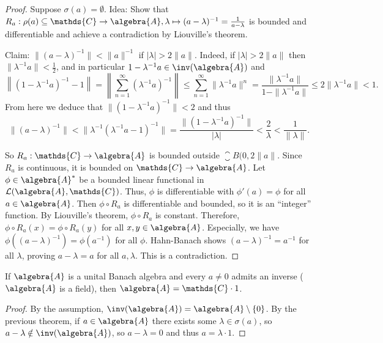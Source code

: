 \documentclass[a4paper]{article}
\begin{document}
\begin{proof}
	Suppose $\sigma(a) = \emptyset$.
	Idea: Show that $R_a: \rho(a) \subseteq \mathds{C} \to \algebra{A}, \lambda \mapsto (a - \lambda)^{-1} = \frac{1}{a - \lambda}$ is bounded and differentiable and achieve a contradiction by Liouville's theorem.

	Claim: $\| (a - \lambda)^{-1}\| < \|a\|^{-1}$ if $|\lambda| > 2 \|a\|$.
	Indeed, if $|\lambda| > 2 \|a\|$ then $\| \lambda^{-1} a \| < \frac{1}{2}$, and in particular $1 - \lambda^{-1} a \in \inv(\algebra{A})$ and
	\begin{equation*}
		\left\| (1 - \lambda^{-1} a)^{-1} - 1 \right\| = \left\| \sum_{n = 1}^{\infty} (\lambda^{-1} a)^{-1} \right\| \leq \sum_{n = 1}^{\infty} \|\lambda^{-1} a\|^n = \frac{\| \lambda^{-1} a \|}{1 - \|\lambda^{-1} a\|} \leq 2 \|\lambda^{-1} a\| < 1\text{.}
	\end{equation*}
	From here we deduce that $\|(1 - \lambda^{-1}a)^{-1}\| < 2$ and thus
	\begin{equation*}
		\|(a - \lambda)^{-1}\| < \|\lambda^{-1} (\lambda^{-1}a - 1)^{-1}\| = \frac{\|(1 - \lambda^{-1} a)^{-1}\|}{|\lambda|} < \frac{2}{\lambda} < \frac{1}{\|\lambda\|}\text{.}
	\end{equation*}

	So $R_a: \mathds{C} \to \algebra{A}$ is bounded outside $\closure{B(0, 2 \|a\|}$.
	Since $R_a$ is continuous, it is bounded on $\mathds{C} \to \algebra{A}$.
	Let $\phi \in \algebra{A}^*$ be a bounded linear functional in $\mathcal{L}(\algebra{A}, \mathds{C})$.
	Thus, $\phi$ is differentiable with $\phi'(a) = \phi$ for all $a \in \algebra{A}$.
	Then $\phi \circ R_a$ is differentiable and bounded, so it is an \enquote{integer} function.
	By Liouville's theorem, $\phi \circ R_a$ is constant.
	Therefore, $\phi \circ R_a(x) = \phi \circ R_a(y)$ for all $x,y \in \algebra{A}$.
	Especially, we have $\phi((a - \lambda)^{-1}) = \phi(a^{-1})$ for all $\phi$.
	Hahn-Banach shows $(a - \lambda)^{-1} = a^{-1}$ for all $\lambda$, proving $a - \lambda = a$ for all $a,\lambda$.
	This is a contradiction.
\end{proof}

\begin{theorem}
	If $\algebra{A}$ is a unital Banach algebra and every $a \neq 0$ admits an inverse ($\algebra{A}$ is a field), then $\algebra{A} = \mathds{C} \cdot 1$.
\end{theorem}

\begin{proof}
	By the assumption, $\inv(\algebra{A}) = \algebra{A} \setminus \{0\}$.
	By the previous theorem, if $a \in \algebra{A}$ there exists some $\lambda \in \sigma(a)$, so $a - \lambda \notin \inv(\algebra{A})$, so $a - \lambda = 0$ and thus $a = \lambda \cdot 1$.
\end{proof}
\end{document}
